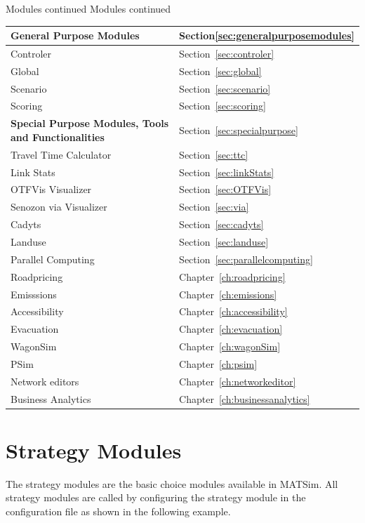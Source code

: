 \createtable%
{Modules continued}%
{Modules continued}%
{\label{tab:modulescontinued}}%
{%
  \begin{tabular}[c]{|l|l|}
	\hline
	\textbf{General Purpose Modules} & Section\ref{sec:generalpurposemodules} \\
	\hline
	Controler & Section~\ref{sec:controler} \\
	Global & Section~\ref{sec:global} \\
	Scenario & Section~\ref{sec:scenario} \\
	Scoring & Section~\ref{sec:scoring} \\
	\hline
	\textbf{Special Purpose Modules, Tools and Functionalities} & Section~\ref{sec:specialpurpose} \\
	\hline
	Travel Time Calculator & Section~\ref{sec:ttc} \\
	Link Stats & Section~\ref{sec:linkStats} \\
	OTFVis Visualizer & Section~\ref{sec:OTFVis} \\
	Senozon via Visualizer & Section~\ref{sec:via} \\
	Cadyts & Section~\ref{sec:cadyts} \\
	Landuse & Section~\ref{sec:landuse} \\
	Parallel Computing & Section~\ref{sec:parallelcomputing} \\
	Roadpricing & Chapter~\ref{ch:roadpricing} \\
	Emisssions & Chapter~\ref{ch:emissions} \\
	Accessibility & Chapter~\ref{ch:accessibility} \\
	Evacuation & Chapter~\ref{ch:evacuation}  \\
	WagonSim & Chapter~\ref{ch:wagonSim} \\
	PSim & Chapter~\ref{ch:psim} \\
	Network editors &  Chapter~\ref{ch:networkeditor} \\
	Business Analytics & Chapter~\ref{ch:businessanalytics} \\
	\hline
	\end{tabular}
}%
{}

\section{Strategy Modules}
\label{sec:strategymodules}
The strategy modules are the basic choice modules available in MATSim. All strategy modules are called by configuring the strategy module in the configuration file as shown in the following example.

